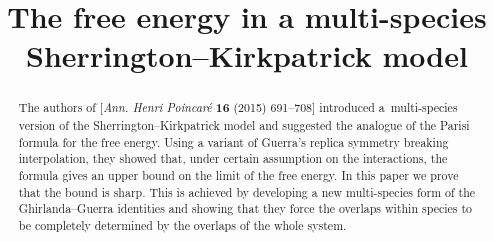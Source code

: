 \documentclass[aop,MSNbibl,dvips]{arximspdf}
\begin{document}
%
\begin{frontmatter}

\title{The free energy in a multi-species Sherrington--Kirkpatrick model}

\begin{aug}
\author{ \corref{}}
%
\address{Department of Mathematics\\
University of Toronto\\
Bahen Centre, 40 St. George St.\\
Toronto, Ontario M5S 2E4\\
Canada\\
}
\end{aug}


%
\begin{abstract}
The authors of
[\textit{Ann. Henri Poincar\'{e}}  \textbf{16} (2015) 691--708]
introduced a~multi-species version of the
Sherrington--Kirkpatrick model and suggested the analogue of the Parisi
formula for the free energy. Using a variant of Guerra's replica
symmetry breaking interpolation, they showed that, under certain
assumption on the interactions, the formula gives an upper bound on the
limit of the free energy. In this paper we prove that the bound is
sharp. This is achieved by developing a new multi-species form of the
Ghirlanda--Guerra identities and showing that they force the overlaps
within species to be completely determined by the overlaps of the whole system.
\end{abstract}

%
\begin{keyword}[class=AMS]
\end{keyword}

\begin{keyword}
\end{keyword}
%
\end{frontmatter}
%
\end{document}
